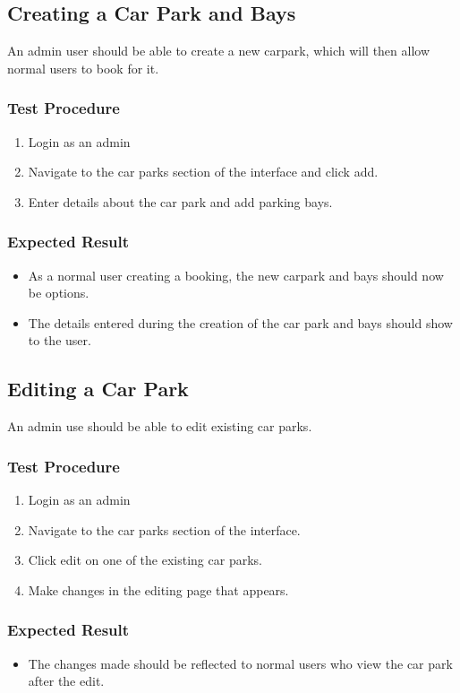 \documentclass[a4paper, draft]{article}
\begin{document}
\newpage
\subsection{Creating a Car Park and Bays}
An admin user should be able to create a new carpark, which will then allow normal users to book for it.

\subsubsection{Test Procedure}
\begin{enumerate}
  \item Login as an admin
  \item Navigate to the car parks section of the interface and click add.
  \item Enter details about the car park and add parking bays.
\end{enumerate}

\subsubsection{Expected Result}
\begin{itemize}
  \item As a normal user creating a booking, the new carpark and bays should now be options.
  \item The details entered during the creation of the car park and bays should show to the user.
\end{itemize}

\subsection{Editing a Car Park}
An admin use should be able to edit existing car parks.

\subsubsection{Test Procedure}
\begin{enumerate}
  \item Login as an admin
  \item Navigate to the car parks section of the interface.
  \item Click edit on one of the existing car parks.
  \item Make changes in the editing page that appears.
\end{enumerate}

\subsubsection{Expected Result}
\begin{itemize}
  \item The changes made should be reflected to normal users who view the car park after the edit.
\end{itemize}
\end{document}
